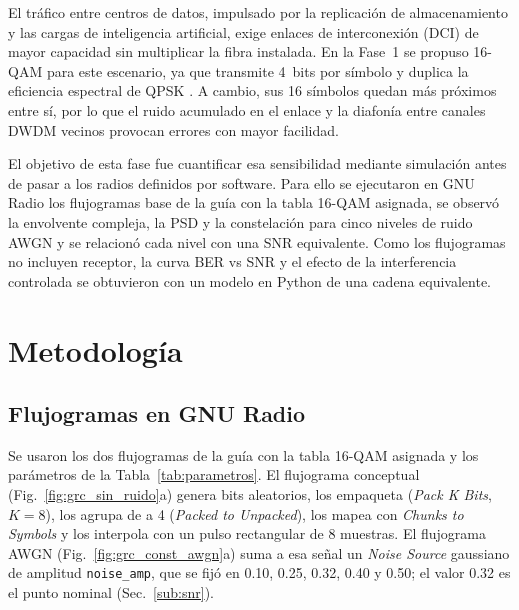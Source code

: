 \documentclass[twocolumn]{IEEEtran}
\begin{document}
El tráfico entre centros de datos, impulsado por la replicación de almacenamiento y las cargas de inteligencia artificial, exige enlaces de interconexión (DCI) de mayor capacidad sin multiplicar la fibra instalada. En la Fase~1 se propuso 16-QAM para este escenario, ya que transmite 4~bits por símbolo y duplica la eficiencia espectral de QPSK \cite{a1e2026fase1, winzer2006advanced}. A cambio, sus 16 símbolos quedan más próximos entre sí, por lo que el ruido acumulado en el enlace y la diafonía entre canales DWDM vecinos provocan errores con mayor facilidad.

El objetivo de esta fase fue cuantificar esa sensibilidad mediante simulación antes de pasar a los radios definidos por software. Para ello se ejecutaron en GNU Radio los flujogramas base de la guía \cite{tijaro2026guia1fase2} con la tabla 16-QAM asignada, se observó la envolvente compleja, la PSD y la constelación para cinco niveles de ruido AWGN y se relacionó cada nivel con una SNR equivalente. Como los flujogramas no incluyen receptor, la curva BER vs SNR y el efecto de la interferencia controlada se obtuvieron con un modelo en Python de una cadena equivalente.

\section{Metodología}

\subsection{Flujogramas en GNU Radio}

Se usaron los dos flujogramas de la guía \cite{tijaro2026guia1fase2} con la tabla 16-QAM asignada y los parámetros de la Tabla~\ref{tab:parametros}. El flujograma conceptual (Fig.~\ref{fig:grc_sin_ruido}a) genera bits aleatorios, los empaqueta (\textit{Pack K Bits}, $K=8$), los agrupa de a 4 (\textit{Packed to Unpacked}), los mapea con \textit{Chunks to Symbols} y los interpola con un pulso rectangular de 8 muestras. El flujograma AWGN (Fig.~\ref{fig:grc_const_awgn}a) suma a esa señal un \textit{Noise Source} gaussiano de amplitud \texttt{noise\_amp}, que se fijó en 0.10, 0.25, 0.32, 0.40 y 0.50; el valor 0.32 es el punto nominal (Sec.~\ref{sub:snr}).
\end{document}

